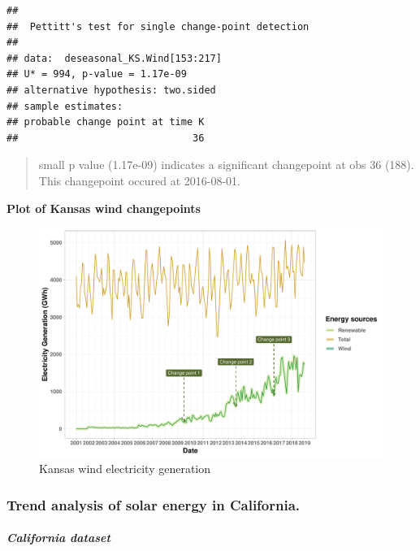 \documentclass[12pt,]{article}
\let\oldsubparagraph\subparagraph
\renewcommand{\subparagraph}[1]{\oldsubparagraph{#1}\mbox{}}
\begin{document}
\begin{verbatim}
## 
##  Pettitt's test for single change-point detection
## 
## data:  deseasonal_KS.Wind[153:217]
## U* = 994, p-value = 1.17e-09
## alternative hypothesis: two.sided
## sample estimates:
## probable change point at time K 
##                              36
\end{verbatim}

\begin{quote}
small p value (1.17e-09) indicates a significant changepoint at obs 36
(188). This changepoint occured at 2016-08-01.
\end{quote}

\textbf{Plot of Kansas wind changepoints}

\begin{figure}
\centering
\includegraphics{Kara_ENV872_Project_files/figure-latex/unnamed-chunk-42-1.pdf}
\caption{Kansas wind electricity generation}
\end{figure}

\subsubsection{Trend analysis of solar energy in
California.}\label{trend-analysis-of-solar-energy-in-california.}

\subparagraph{California dataset}\label{california-dataset}
\end{document}
